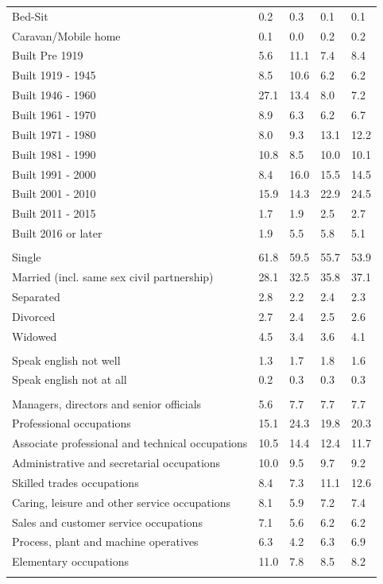 \documentclass{article}
\begin{document}
\begin{table}[h]
\begin{tabular}{KTTTT}
Bed-Sit & 0.2& 0.3& 0.1& 0.1\\
Caravan/Mobile home & 0.1& 0.0& 0.2& 0.2\\
    \hline
Built Pre 1919 &  5.6& 11.1&  7.4&  8.4\\
Built 1919 - 1945 &  8.5& 10.6&  6.2&  6.2\\
Built  1946 - 1960 & 27.1& 13.4&  8.0&  7.2\\
Built  1961 - 1970 & 8.9& 6.3& 6.2& 6.7\\
Built  1971 - 1980 &  8.0&  9.3& 13.1& 12.2\\
Built  1981 - 1990 & 10.8&  8.5& 10.0& 10.1\\
Built  1991 - 2000 &  8.4& 16.0& 15.5& 14.5\\
Built  2001 - 2010 & 15.9& 14.3& 22.9& 24.5\\
Built  2011 - 2015 & 1.7& 1.9& 2.5& 2.7\\
Built  2016 or later & 1.9& 5.5& 5.8& 5.1\\
\hline
    \\
    \hline
Single & 61.8& 59.5& 55.7& 53.9\\
Married (incl. same sex civil partnership) & 28.1& 32.5& 35.8& 37.1\\
Separated  & 2.8& 2.2& 2.4& 2.3\\
Divorced  & 2.7& 2.4& 2.5& 2.6\\
Widowed & 4.5& 3.4& 3.6& 4.1\\
\hline
    \\ 
    \hline
Speak english not well & 1.3& 1.7& 1.8& 1.6\\
Speak english not at all & 0.2& 0.3& 0.3& 0.3\\
\hline
    \\
    \hline
Managers, directors and senior officials & 5.6& 7.7& 7.7& 7.7\\
Professional occupations & 15.1& 24.3& 19.8& 20.3\\
Associate professional and technical occupations & 10.5& 14.4& 12.4& 11.7\\
Administrative and secretarial occupations & 10.0&  9.5&  9.7&  9.2\\
Skilled trades occupations &  8.4&  7.3& 11.1& 12.6\\
Caring, leisure and other service occupations & 8.1& 5.9& 7.2& 7.4\\
Sales and customer service occupations & 7.1& 5.6& 6.2& 6.2\\
Process, plant and machine operatives & 6.3& 4.2& 6.3& 6.9\\
Elementary occupations & 11.0&  7.8&  8.5&  8.2\\
\hline
\end{tabular}
\end{table}
\end{document}
